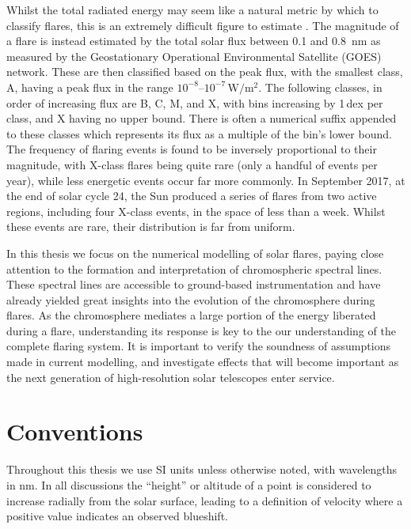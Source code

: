 Whilst the total radiated energy may seem like a natural metric by which to classify flares, this is an extremely difficult figure to estimate \citep[e.g.][]{Milligan2014}.
The magnitude of a flare is instead estimated by the total solar flux between 0.1 and \SI{0.8}{\nano\metre} as measured by the Geostationary Operational Environmental Satellite (GOES) network.
These are then classified based on the peak flux, with the smallest class, A, having a peak flux in the range $10^{-8}$--$10^{-7}\,\si{\watt\per\square\m}$.
The following classes, in order of increasing flux are B, C, M, and X, with bins increasing by 1\,dex per class, and X having no upper bound.
There is often a numerical suffix appended to these classes which represents its flux as a multiple of the bin's lower bound.
The frequency of flaring events is found to be inversely proportional to their magnitude, with X-class flares being quite rare (only a handful of events per year), while less energetic events occur far more commonly.
In September 2017, at the end of solar cycle 24, the Sun produced a series of flares from two active regions, including four X-class events, in the space of less than a week.
Whilst these events are rare, their distribution is far from uniform.

In this thesis we focus on the numerical modelling of solar flares, paying close attention to the formation and interpretation of chromospheric spectral lines.
These spectral lines are accessible to ground-based instrumentation and have already yielded great insights into the evolution of the chromosphere during flares.
As the chromosphere mediates a large portion of the energy liberated during a flare, understanding its response is key to the our understanding of the complete flaring system.
It is important to verify the soundness of assumptions made in current modelling, and investigate effects that will become important as the next generation of high-resolution solar telescopes enter service.


\section{Conventions}\label{Sec:Conventions}

Throughout this thesis we use SI units unless otherwise noted, with wavelengths in \si{\nano\m}.
In all discussions the ``height'' or altitude of a point is considered to increase radially from the solar surface, leading to a definition of velocity where a positive value indicates an observed blueshift.

